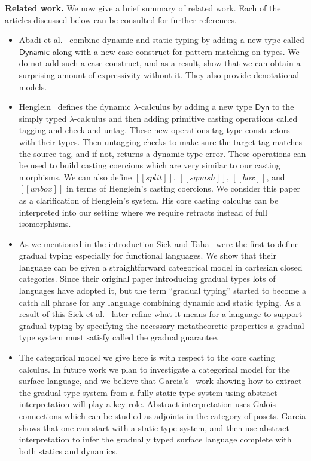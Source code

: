 \textbf{Related work.}  We now give a brief summary of related
work. Each of the articles discussed below can be consulted for
further references.
\begin{itemize}
\item Abadi et al.~\cite{Abadi:1989} combine dynamic and static typing
  by adding a new type called $\mathsf{Dynamic}$ along with a new case
  construct for pattern matching on types.  We do not add such a case
  construct, and as a result, show that we can obtain a surprising
  amount of expressivity without it.  They also provide denotational
  models.

\item Henglein~\cite{Henglein:1994} defines the dynamic
  $\lambda$-calculus by adding a new type $\mathsf{Dyn}$ to the simply
  typed $\lambda$-calculus and then adding primitive casting
  operations called tagging and check-and-untag.  These new operations
  tag type constructors with their types.  Then untagging checks to
  make sure the target tag matches the source tag, and if not, returns
  a dynamic type error.  These operations can be used to build casting
  coercions which are very similar to our casting morphisms. We can
  also define $[[split]]$, $[[squash]]$, $[[box]]$, and $[[unbox]]$ in
  terms of Henglein's casting coercions.  We consider this paper as a
  clarification of Henglein's system.  His core casting calculus can
  be interpreted into our setting where we require retracts instead of
  full isomorphisms.

\item As we mentioned in the introduction Siek and
  Taha~\cite{Siek:2006} were the first to define gradual typing
  especially for functional languages.  We show that their language
  can be given a straightforward categorical model in cartesian closed
  categories.  Since their original paper introducing gradual types
  lots of languages have adopted it, but the term ``gradual typing''
  started to become a catch all phrase for any language combining
  dynamic and static typing.  As a result of this Siek et
  al.~\cite{Siek:2015} later refine what it means for a language to
  support gradual typing by specifying the necessary metatheoretic
  properties a gradual type system must satisfy called the gradual
  guarantee.

\item The categorical model we give here is with respect to the core
  casting calculus.  In future work we plan to investigate a
  categorical model for the surface language, and we believe that
  Garcia's~\cite{Garcia:2016} work showing how to extract the gradual
  type system from a fully static type system using abstract
  interpretation will play a key role.  Abstract interpretation uses
  Galois connections which can be studied as adjoints in the category
  of posets.  Garcia shows that one can start with a static type
  system, and then use abstract interpretation to infer the gradually
  typed surface language complete with both statics and dynamics.

\end{itemize}

